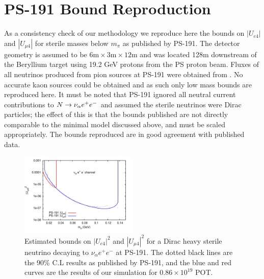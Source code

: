 \documentclass[11pt, a4paper]{article}
\def\ster{\ensuremath N}
\begin{document}
\section{PS-191 Bound Reproduction\label{sec:ps191}}

As a consistency check of our methodology we reproduce here the bounds on
$|U_{e4}|$ and $|U_{\mu 4}|$ for sterile masses below $m_\pi$ as published by
PS-191. The detector geometry is assumed to be $6\text{m} \times 3\text{m}
\times 12 \text{m}$ and was located 128m downstream of the Beryllium target
using 19.2 GeV protons from the PS proton beam.  Fluxes of all neutrinos
produced from pion sources at PS-191 were obtained from \cite{ps191THesis}. No
accurate kaon sources could be obtained and as such only low mass bounds are
reproduced here. It must be noted that PS-191 ignored all neutral current
contributions to $\ster \rightarrow \nu_\alpha e^+ e^-$ and assumed the sterile
neutrinos were Dirac particles; the effect of this is that the bounds published
are not directly comparable to the minimal model discussed above, and must be
scaled appropriately. The bounds reproduced are in good agreement with published
data.

\begin{figure}
			  \centering
			 
\includegraphics[width=0.5\textwidth]{figures/PS-191_test.pdf}

\caption{\label{fig:ps191test} Estimated bounds on $|U_{e4}|^2$ and $|U_{\mu
4}|^2$ for a Dirac heavy sterile neutrino decaying to $\nu_\alpha e^+ e^-$ at
PS-191. The dotted black lines are the 90\% C.L results as published by PS-191,
and the blue and red curves are the results of our simulation for $0.86 \times
10^{19}$ POT.}

\end{figure}
\end{document}
